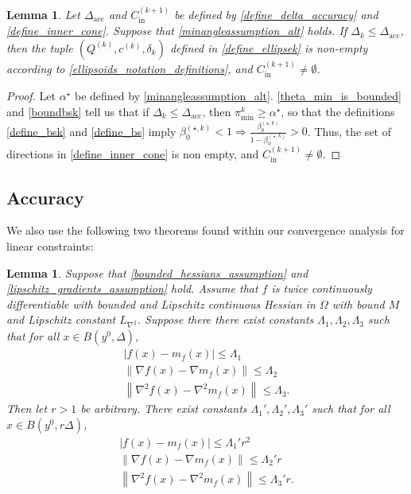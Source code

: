\documentclass{article}
\newtheorem{lemma}[theorem]{Lemma}
\theoremstyle{case}
\numberwithin{theorem}{subsection}
\newcommand{\bsk}{{\beta_0^{(\star, k)}}}
\newcommand{\ck}{{c^{(k)}}}
\newcommand{\dacc}{{\Delta_{\textrm{acc}}}}
\newcommand{\dk}{\Delta_k}
\newcommand{\fcki}{{C^{(k+1)}_{\textrm{in}}}}
\newcommand{\gradf}{\nabla f}
\newcommand{\liphess}{{L_{\nabla^2}}}
\newcommand{\minanglealpha}{{ \alpha^{\star} }}
\newcommand{\qk}{{Q^{(k)}}}
\newcommand{\sdk}{{\delta_k}}
\newcommand{\thetamink}{{\pi^k_{\textrm{min}}}}
\begin{document}
\begin{lemma}
\label{sampletrk_is_nonempty}
Let $\dacc$ and $\fcki$ be defined by \cref{define_delta_accuracy} and \cref{define_inner_cone}.
Suppose that \cref{minangleassumption_alt} holds.
If $\dk \le \dacc$, then the tuple $(\qk, \ck, \sdk)$ defined in \cref{define_ellipsek}
is non-empty according to \cref{ellipsoids_notation_definitions}, and $\fcki \ne \emptyset$.
\end{lemma}
\begin{proof}
Let $\minanglealpha$ be defined by \cref{minangleassumption_alt}.
\cref{theta_min_is_bounded} and \cref{boundbsk} tell us that 
if $\dk \le \dacc$, then $\thetamink \ge \minanglealpha$, 
so that the definitions \cref{define_bsk} and \cref{define_bs} imply
$\bsk < 1 \Longrightarrow \frac{\bsk}{1 - \bsk} > 0$.
Thus, the set of directions in \cref{define_inner_cone} is non empty, and
$\fcki \ne \emptyset$.
\end{proof}


\subsection{Accuracy}
\label{ellipsoidal_lambda}

We also use the following two theorems found within our convergence analysis for linear constraints:

\begin{lemma}
\label{change_radius} 
Suppose that \cref{bounded_hessians_assumption} and \cref{lipschitz_gradients_assumption} hold.
Assume that $f$ is twice continuously differentiable with bounded and Lipschitz continuous Hessian in $\Omega$ with bound $M$ and Lipschitz constant $\liphess$.
Suppose there there exist constants $\Lambda_1, \Lambda_2, \Lambda_3$ such that for all $x \in B\left(y^0, \Delta\right)$,
\begin{align*}
\left|f(x) - m_f(x)\right| \le \Lambda_1 \\ %
\left\|\gradf(x) - \nabla m_f(x)\right\| \le \Lambda_2 \\ %
\left\|\nabla^2 f(x) - \nabla^2 m_f(x)\right\| \le \Lambda_3. %
\end{align*}
Then let $r > 1$ be arbitrary.
There exist constants $\Lambda_1', \Lambda_2', \Lambda_3'$ such that for all $x \in B\left(y^0, r\Delta\right)$,
\begin{align*}
\left|f(x) - m_f(x)\right| \le \Lambda_1' r^2 \\ %
\left\|\gradf(x) - \nabla m_f(x)\right\| \le \Lambda_2' r\\ %
\left\|\nabla^2 f(x) - \nabla^2 m_f(x)\right\| \le \Lambda_3' r .%
\end{align*}
\end{lemma}
\end{document}
